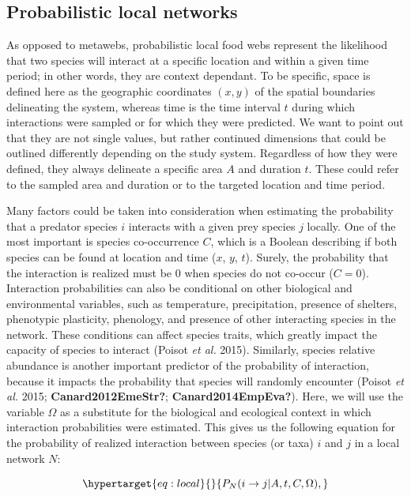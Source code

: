 \documentclass[10pt,oneside]{article}
\begin{document}
\hypertarget{probabilistic-local-networks}{%
\subsection{Probabilistic local
networks}\label{probabilistic-local-networks}}

As opposed to metawebs, probabilistic local food webs represent the
likelihood that two species will interact at a specific location and
within a given time period; in other words, they are context dependant.
To be specific, space is defined here as the geographic coordinates
\((x, y)\) of the spatial boundaries delineating the system, whereas
time is the time interval \(t\) during which interactions were sampled
or for which they were predicted. We want to point out that they are not
single values, but rather continued dimensions that could be outlined
differently depending on the study system. Regardless of how they were
defined, they always delineate a specific area \(A\) and duration \(t\).
These could refer to the sampled area and duration or to the targeted
location and time period.

Many factors could be taken into consideration when estimating the
probability that a predator species \(i\) interacts with a given prey
species \(j\) locally. One of the most important is species
co-occurrence \(C\), which is a Boolean describing if both species can
be found at location and time (\(x\), \(y\), \(t\)). Surely, the
probability that the interaction is realized must be \(0\) when species
do not co-occur (\(C = 0\)). Interaction probabilities can also be
conditional on other biological and environmental variables, such as
temperature, precipitation, presence of shelters, phenotypic plasticity,
phenology, and presence of other interacting species in the network.
These conditions can affect species traits, which greatly impact the
capacity of species to interact (Poisot \emph{et al.} 2015). Similarly,
species relative abundance is another important predictor of the
probability of interaction, because it impacts the probability that
species will randomly encounter (Poisot \emph{et al.} 2015;
\textbf{Canard2012EmeStr?}; \textbf{Canard2014EmpEva?}). Here, we will
use the variable \(\Omega\) as a substitute for the biological and
ecological context in which interaction probabilities were estimated.
This gives us the following equation for the probability of realized
interaction between species (or taxa) \(i\) and \(j\) in a local network
\(N\):

\begin{equation}\protect\hypertarget{eq:local}{}{P_{N}(i \rightarrow j | A, t, C, \Omega),}\label{eq:local}\end{equation}
\end{document}
